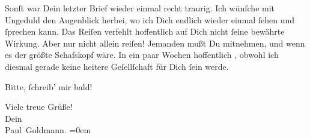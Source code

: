\pstart
           Sonſt war Dein letzter Brief  wieder einmal recht
               traurig. Ich wünſche mit Ungeduld den Augenblick herbei, wo ich Dich endlich wieder
               einmal  ſehen und ſprechen kann. Das Reiſen verfehlt hoffentlich auf Dich nicht ſeine
               bewährte Wirkung. Aber nur nicht allein reiſen! Jemanden mußt Du mitnehmen, und wenn
               es der größte Schafskopf wäre. In ein paar Wochen hoffentlich \label{K_L02878-4v}\label{K_L02878-4},
                  \strikeout{\textcolor{gray}{×}\-\textcolor{gray}{×}} obwohl ich diesmal gerade keine heitere Geſellſchaft für Dich ſein werde.\pend
           
\pstart
           Bitte, ſchreib’ mir bald!\pend
           
\pstart
           Viele treue Grüße! {\\[\baselineskip]}Dein {\\[\baselineskip]}\spacefill\mbox{Paul Goldmann.}\pend
           \leftskip=0em{}\endnumbering{}  
      